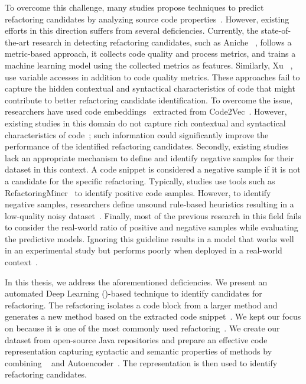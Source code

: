 To overcome this challenge, many studies propose techniques to predict refactoring candidates by analyzing source code properties~\cite{Aniche2020Effectiveness, Karakati2023Software, Kurbatova2020Recommendation}.
However, existing efforts in
this direction
suffers from several deficiencies. 
Currently, the state-of-the-art research in detecting refactoring candidates, 
such as Aniche \etal{}~\cite{Aniche2020Effectiveness}, 
follows a metric-based approach, \ie{} it collects code quality and process metrics, and trains a machine learning model using the collected metrics as features.
Similarly, Xu \etal{}~\cite{Xu2017}, use variable accesses in addition to code quality metrics.
These approaches fail to capture the hidden contextual and syntactical characteristics of code that might contribute to better refactoring candidate identification. 
To overcome the issue,
researchers have used code embeddings~\cite{Kurbatova2020Recommendation, Karakati2023Software} extracted from Code2Vec~\cite{Alon2019Code2vec}. 
However, existing studies in this domain do not capture rich contextual and syntactical characteristics of code~\cite{Karmakae2021Modelcoderep};
such information could significantly improve the performance of the identified refactoring candidates.
Secondly, existing studies lack an appropriate mechanism to define and identify negative samples for their dataset in this context.
A code snippet is considered a negative sample if it is not a candidate for the specific refactoring.
Typically, studies use tools such as RefactoringMiner~\cite{Tsantalis:ICSE:2018:RefactoringMiner, Tsantalis:TSE:2020:RefactoringMiner2.0} to identify positive code samples. 
However, to identify negative samples, researchers define unsound rule-based heuristics
resulting in a low-quality noisy dataset~\cite{trautsch2023really}.
Finally, most of the previous research in this field fails to consider the real-world ratio of positive and negative samples while evaluating the predictive models. 
Ignoring this guideline
results in a model that works well in an experimental study but performs poorly when deployed in a real-world context~\cite{Sharma2021, DiNucci2018}.

In this thesis, we address the aforementioned deficiencies.
We present an automated Deep Learning (\dl{})-based technique to identify candidates for \exm{} refactoring. 
The \exm{} refactoring isolates a code block from a larger method and generates a new method based on the extracted code snippet~\cite{Fowler1999Refactoring}. 
We kept our focus on \exm{} because it is one of the most commonly used refactoring~\cite{Murphy-Hill2012}. 
We create our dataset from open-source Java repositories and 
prepare an effective code representation capturing syntactic and semantic properties of methods by combining \GCB{}~\cite{Guo2020GraphCodeBERT} and Autoencoder~\cite{Liou2014Autoencoder}.
The representation is then used to identify \exm{} refactoring candidates.

